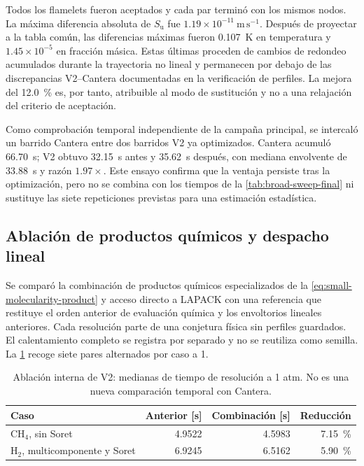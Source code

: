 \documentclass[12pt,a4paper,twoside,openany]{book}
\newcommand{\Su}{S_{\mathrm{u}}}
\begin{document}
Todos los flamelets fueron aceptados y cada par terminó con los mismos nodos.
La máxima diferencia absoluta de \(\Su\) fue
\(1.19\times10^{-11}\ \mathrm{m\,s^{-1}}\). Después de proyectar a la tabla
común, las diferencias máximas fueron \SI{0.107}{\kelvin} en temperatura y
\(1.45\times10^{-5}\) en fracción másica. Estas últimas proceden de cambios de
redondeo acumulados durante la trayectoria no lineal y permanecen por debajo de
las discrepancias V2--Cantera documentadas en la verificación de perfiles. La
mejora del \SI{12.0}{\percent} es, por tanto, atribuible al modo de sustitución y
no a una relajación del criterio de aceptación.

Como comprobación temporal independiente de la campaña principal, se intercaló
un barrido Cantera entre dos barridos V2 ya optimizados. Cantera acumuló
\SI{66.70}{\second}; V2 obtuvo \SI{32.15}{\second} antes y
\SI{35.62}{\second} después, con mediana envolvente de
\SI{33.88}{\second} y razón \(1.97\times\). Este ensayo confirma que la ventaja
persiste tras la optimización, pero no se combina con los tiempos de la \cref{tab:broad-sweep-final} ni sustituye las siete repeticiones previstas para
una estimación estadística.

\subsection{Ablación de productos químicos y despacho lineal}
\label{sec:chemical-products-ablation}

Se comparó la combinación de productos químicos especializados de la \cref{eq:small-molecularity-product} y acceso directo a LAPACK con una
referencia que restituye el orden anterior de evaluación química y los
envoltorios lineales anteriores. Cada resolución parte de una conjetura física
sin perfiles guardados. El calentamiento completo se registra por separado y
no se reutiliza como semilla. La \cref{tab:chemical-products-ablation} recoge
siete pares alternados por caso a \SI{1}{\atmosphere}.

\begin{table}[htbp]
\centering
\caption{Ablación interna de V2: medianas de tiempo de resolución a 1 atm.
No es una nueva comparación temporal con Cantera.}
\label{tab:chemical-products-ablation}
\begin{tabular}{@{}lrrr@{}}
\toprule
\textbf{Caso} & \textbf{Anterior [s]} & \textbf{Combinación [s]} &
\textbf{Reducción} \\
\midrule
CH\(_4\), sin Soret & 4.9522 & 4.5983 & \SI{7.15}{\percent} \\
H\(_2\), multicomponente y Soret & 6.9245 & 6.5162 & \SI{5.90}{\percent} \\
\bottomrule
\end{tabular}
\end{table}
\end{document}
